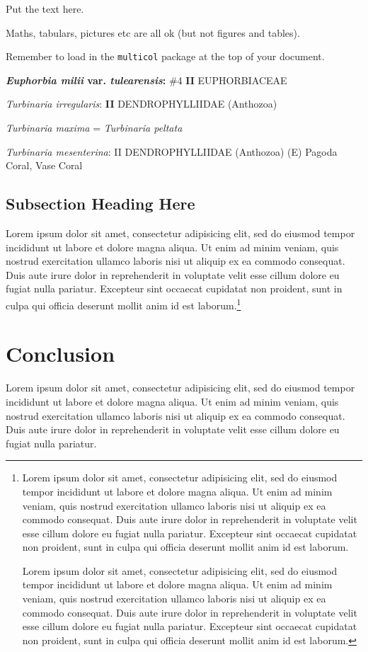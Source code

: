 \rmfamily
{}

\begin{multicols}{2}{
Put the text here.

Maths, tabulars, pictures etc are all ok (but not
figures and tables).

Remember to load in the \texttt{multicol}
package at the top of your document.

\textbf{\textit{Euphorbia milii} var. \textit{tulearensis}:} \#4 \textbf{II} EUPHORBIACEAE

\textit{Turbinaria irregularis}: \textbf{II}  DENDROPHYLLIIDAE (Anthozoa)

\textit{Turbinaria maxima} = \textit{Turbinaria peltata}

\textit{Turbinaria mesenterina}: II  DENDROPHYLLIIDAE (Anthozoa) (E) Pagoda Coral, Vase Coral

}
\end{multicols}

\subsection{Subsection Heading Here}

Lorem ipsum dolor sit amet, consectetur adipisicing elit, sed do eiusmod tempor
incididunt ut labore et dolore magna aliqua. Ut enim ad minim veniam, quis
nostrud exercitation ullamco laboris nisi ut aliquip ex ea commodo consequat.
Duis aute irure dolor in reprehenderit in voluptate velit esse cillum dolore eu
fugiat nulla pariatur. Excepteur sint occaecat cupidatat non proident, sunt in
culpa qui officia deserunt mollit anim id est laborum.\footnote{Lorem ipsum dolor sit amet, consectetur adipisicing elit, sed do eiusmod tempor
incididunt ut labore et dolore magna aliqua. Ut enim ad minim veniam, quis
nostrud exercitation ullamco laboris nisi ut aliquip ex ea commodo consequat.
Duis aute irure dolor in reprehenderit in voluptate velit esse cillum dolore eu
fugiat nulla pariatur. Excepteur sint occaecat cupidatat non proident, sunt in
culpa qui officia deserunt mollit anim id est laborum.

Lorem ipsum dolor sit amet, consectetur adipisicing elit, sed do eiusmod tempor
incididunt ut labore et dolore magna aliqua. Ut enim ad minim veniam, quis
nostrud exercitation ullamco laboris nisi ut aliquip ex ea commodo consequat.
Duis aute irure dolor in reprehenderit in voluptate velit esse cillum dolore eu
fugiat nulla pariatur. Excepteur sint occaecat cupidatat non proident, sunt in
culpa qui officia deserunt mollit anim id est laborum.}


\section{Conclusion}

Lorem ipsum dolor sit amet, consectetur adipisicing elit, sed do eiusmod tempor
incididunt ut labore et dolore magna aliqua. Ut enim ad minim veniam, quis
nostrud exercitation ullamco laboris nisi ut aliquip ex ea commodo consequat.
Duis aute irure dolor in reprehenderit in voluptate velit esse cillum dolore eu
fugiat nulla pariatur.